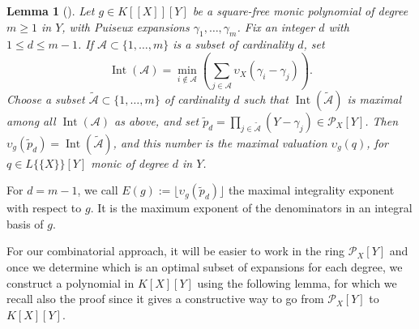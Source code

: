 \documentclass[a4paper,11pt]{amsart}%
\theoremstyle{definition}
\theoremstyle{plain}
\newtheorem{lemma}[defn]{Lemma}
\theoremstyle{remark}
\DeclareMathOperator{\Int}{Int}
\begin{document}
\begin{lemma}[{\cite[Lemma 21]{intbas}}]
\label{lemma:intA} Let $g\in K[[X]][Y]$ be a square-free monic polynomial of degree
$m\geq 1$ in $Y$, with Puiseux expansions $\gamma_{1}, \dots, \gamma_{m}$. Fix
an integer $d$ with $1\leq d \leq m-1$. If $\mathcal{A}\subset\{1,\dots,m\}$ is
a subset of cardinality $d$, set
\[
\Int({\mathcal{A}})=\min_{i\not \in \mathcal{A}}\left(  \sum_{j\in\mathcal{A}%
}\upsilon_X(\gamma_{i}-\gamma_{j})\right).
\]
Choose a subset $\widetilde{\mathcal{A}}\subset\{1,\dots,m\}$ of cardinality
$d$ such that $\Int({\widetilde{\mathcal{A}}})$ is maximal among all
$\Int({\mathcal{A}})$ as above, and set $\widetilde{p}_d=\prod_{j\in
\widetilde{\mathcal{A}}}(Y-\gamma_{j})\in{\mathcal{P}_{X}}[Y]$. Then
$\upsilon_{g}(\widetilde{p}_d)=\Int({\widetilde{\mathcal{A}}})$, and this number is the
maximal valuation $\upsilon_{g}(q)$, for
$q\in L\{\{X\}\}[Y]$ monic of degree $d$ in $Y$.
\end{lemma}

For $d = m - 1$, we call $E(g):=\lfloor \upsilon_{g}(\widetilde{p}_d) \rfloor$ the maximal integrality exponent with respect to $g$. It is the maximum exponent of the denominators in an integral basis of $g$.

For our combinatorial approach, it will be easier to work in the ring $\mathcal{P}_{X}[Y]$ and once we determine which is an optimal subset of expansions for each degree, we construct a polynomial in $K[X][Y]$ using the following lemma, for which we recall also the proof since it gives a constructive way to go from $\mathcal{P}_{X}[Y]$  to $K[X][Y]$.
\end{document}
